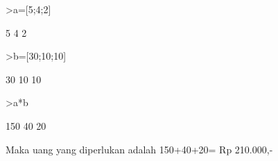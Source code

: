 \documentclass[12pt,Times new roman,letterpaper]{book}
\begin{document}
\begin{eulernootebook}
\begin{eulercomment}
\begin{eulercomment}
\begin{eulernootebook}
\begin{eulercomment}
\begin{eulercomment}
\begin{eulercomment}
\begin{eulercomment}
\begin{eulercomment}
\begin{eulercomment}
\begin{eulercomment}
\begin{eulercomment}
\begin{eulercomment}
\begin{eulercomment}
\begin{eulercomment}
\begin{eulercomment}
\begin{eulercomment}
\begin{eulerttcomment}
\end{eulerttcomment}
\begin{eulerprompt}
>a=[5;4;2]
\end{eulerprompt}
\begin{euleroutput}
          5 
          4 
          2 
\end{euleroutput}
\begin{eulerprompt}
>b=[30;10;10]
\end{eulerprompt}
\begin{euleroutput}
         30 
         10 
         10 
\end{euleroutput}
\begin{eulerprompt}
>a*b
\end{eulerprompt}
\begin{euleroutput}
        150 
         40 
         20 
\end{euleroutput}
\begin{eulercomment}
Maka uang yang diperlukan adalah 150+40+20= Rp 210.000,-


\end{eulercomment}
\end{eulercomment}
\end{eulercomment}
\end{eulercomment}
\end{eulercomment}
\end{eulercomment}
\end{eulercomment}
\end{eulercomment}
\end{eulercomment}
\end{eulercomment}
\end{eulercomment}
\end{eulercomment}
\end{eulercomment}
\end{eulercomment}
\end{eulernootebook}
\end{eulercomment}
\end{eulercomment}
\end{eulernootebook}
\end{document}
